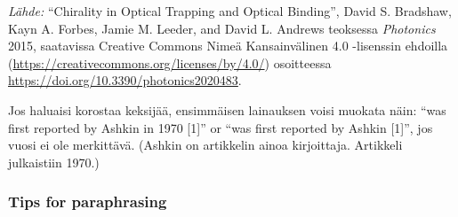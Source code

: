 \documentclass[finnish, 12pt, a4paper, arts, utf8, a-2b, online]{aaltothesis}
\begin{document}

\vspace{1ex}
\noindent
\textit{Lähde:} “Chirality in Optical Trapping and Optical Binding”, David S.
Bradshaw, Kayn A. Forbes, Jamie M. Leeder, and David L. Andrews teoksessa 
\textit{Photonics} 2015, saatavissa Creative Commons Nimeä Kansainvälinen 4.0 
-lisenssin ehdoilla (\url{https://creativecommons.org/licenses/by/4.0/}) 
osoitteessa \url{https://doi.org/10.3390/photonics2020483}.

Jos haluaisi korostaa keksijää, ensimmäisen lainauksen voisi muokata näin: “was 
first reported by Ashkin in 1970 [1]” or “was first reported by Ashkin [1]”, jos 
vuosi ei ole merkittävä. (Ashkin on artikkelin ainoa kirjoittaja. Artikkeli 
julkaistiin 1970.)

\subsubsection*{Tips for paraphrasing}
\end{document}
